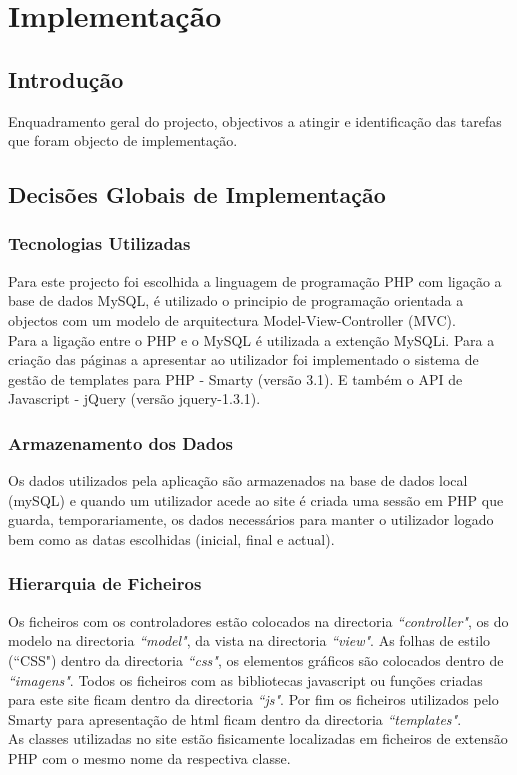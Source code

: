 \chapter{Implementação}

\section{Introdução}

Enquadramento geral do projecto, objectivos a atingir e identificação das tarefas que foram objecto de implementação.

\section{Decisões Globais de Implementação}

\subsection{Tecnologias Utilizadas}
Para este projecto foi escolhida a linguagem de programação PHP com ligação a base de dados MySQL, é utilizado o principio de programação orientada a objectos com um modelo de arquitectura Model-View-Controller (MVC).\\
Para a ligação entre o PHP e o MySQL é utilizada a extenção MySQLi.
Para a criação das páginas a apresentar ao utilizador foi implementado o sistema de gestão de templates para PHP - Smarty (versão 3.1). E também o API de Javascript - jQuery (versão jquery-1.3.1).

\subsection{Armazenamento dos Dados}
Os dados utilizados pela aplicação são armazenados na base de dados local (mySQL) e quando um utilizador acede ao site é criada uma sessão em PHP que guarda, temporariamente, os dados necessários para manter o utilizador logado bem como as datas escolhidas (inicial, final e actual).

\subsection{Hierarquia de Ficheiros}
Os ficheiros com os controladores estão colocados na directoria \textit{``controller"}, os do modelo na directoria \textit{``model"}, da vista na directoria \textit{``view"}. As folhas de estilo (``CSS") dentro da directoria \textit{``css"}, os elementos gráficos são colocados dentro de \textit{``imagens"}. Todos os ficheiros com as bibliotecas javascript ou funções criadas para este site ficam dentro da directoria \textit{``js"}. Por fim os ficheiros utilizados pelo Smarty para apresentação de html ficam dentro da directoria \textit{``templates"}.\\
As classes utilizadas no site estão fisicamente localizadas em ficheiros de extensão PHP com o mesmo nome da respectiva classe.\\

